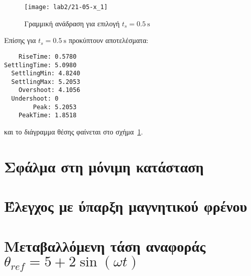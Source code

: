 \begin{figure}[htb]
  \centering
  \texttt{[image: lab2/21-05-x\_1]}
  \caption[Γραμμική ανάδραση με μειωμένο χρόνο αποκατάστασης]{Γραμμική ανάδραση για επιλογή $t_s = \SI{0.5}{\second}$}
  \label{fig:21-05}
\end{figure}

Επίσης για $t_s = \SI{0.5}{\second}$ προκύπτουν αποτελέσματα:
\begin{code}
\begin{verbatim}
    RiseTime: 0.5780
SettlingTime: 5.0980
  SettlingMin: 4.8240
  SettlingMax: 5.2053
    Overshoot: 4.1056
  Undershoot: 0
        Peak: 5.2053
    PeakTime: 1.8518
\end{verbatim}
\end{code}
και το διάγραμμα θέσης φαίνεται στο σχήμα~\ref{fig:21-05}.

\section{Σφάλμα στη μόνιμη κατάσταση}
\section{Έλεγχος με ύπαρξη μαγνητικού φρένου}
\section[Μεταβαλλόμενη τάση αναφοράς]{Μεταβαλλόμενη τάση αναφοράς $\theta_{ref} = 5 + 2 \sin{\left(\omega t\right)}$}

